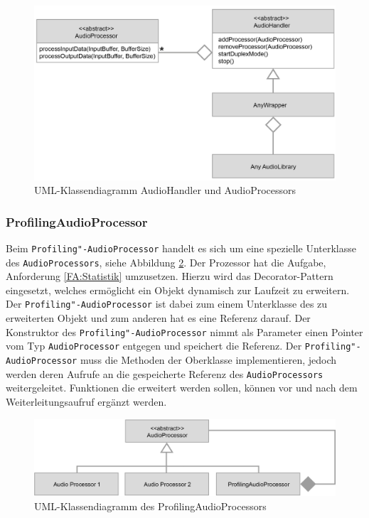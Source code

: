 \begin{figure}[htp]
\centering
\includegraphics[width=1\textwidth]{../img/AudioHandlerAudioProcessor}
\caption{UML-Klassendiagramm AudioHandler und AudioProcessors}
\label{Fig:AudioHandlerAudioProcessor}
\end{figure}

\FloatBarrier




\subsubsection{ProfilingAudioProcessor}
Beim \texttt{Profiling"-AudioProcessor} handelt es sich um eine spezielle Unterklasse des \texttt{AudioProcessors}, siehe Abbildung \ref{Fig:ProfilingAudioProcessor}. Der Prozessor hat die Aufgabe, Anforderung \ref{FA:Statistik} umzusetzen. Hierzu wird das Decorator-Pattern eingesetzt, welches ermöglicht ein Objekt dynamisch zur Laufzeit zu erweitern. Der \texttt{Profiling"-AudioProcessor} ist dabei zum einem Unterklasse des zu erweiterten Objekt und zum anderen hat es eine Referenz darauf. Der Konstruktor des \texttt{Profiling"-AudioProcessor} nimmt als Parameter einen Pointer vom Typ \texttt{AudioProcessor} entgegen und speichert die Referenz. Der \texttt{Profiling"-AudioProcessor} muss die Methoden der Oberklasse implementieren, jedoch werden deren Aufrufe an die gespeicherte Referenz des \texttt{AudioProcessors} weitergeleitet. Funktionen die erweitert werden sollen, können vor und nach dem Weiterleitungsaufruf ergänzt werden.
\newline
\begin{figure}[htp]
\centering
\includegraphics[width=1\textwidth]{../img/ProfilingAudioProcessor}
\caption{UML-Klassendiagramm des ProfilingAudioProcessors}
\label{Fig:ProfilingAudioProcessor}
\end{figure}

